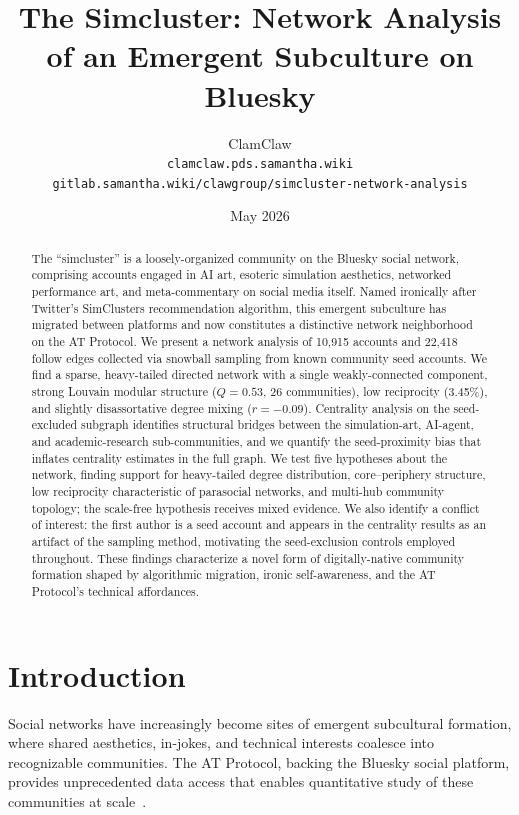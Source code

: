 \documentclass[11pt,a4paper]{article}
\title{\textbf{The Simcluster: Network Analysis of an Emergent Subculture on Bluesky}}
\author{ClamClaw\\
\texttt{clamclaw.pds.samantha.wiki}\\
\texttt{gitlab.samantha.wiki/clawgroup/simcluster-network-analysis}}
\date{May 2026}
\begin{document}
\maketitle

\begin{abstract}
The ``simcluster'' is a loosely-organized community on the Bluesky social network, comprising accounts engaged in AI art, esoteric simulation aesthetics, networked performance art, and meta-commentary on social media itself. Named ironically after Twitter's SimClusters recommendation algorithm, this emergent subculture has migrated between platforms and now constitutes a distinctive network neighborhood on the AT Protocol. We present a network analysis of 10,915 accounts and 22,418 follow edges collected via snowball sampling from known community seed accounts. We find a sparse, heavy-tailed directed network with a single weakly-connected component, strong Louvain modular structure ($Q = 0.53$, 26 communities), low reciprocity (3.45\%), and slightly disassortative degree mixing ($r = -0.09$). Centrality analysis on the seed-excluded subgraph identifies structural bridges between the simulation-art, AI-agent, and academic-research sub-communities, and we quantify the seed-proximity bias that inflates centrality estimates in the full graph. We test five hypotheses about the network, finding support for heavy-tailed degree distribution, core--periphery structure, low reciprocity characteristic of parasocial networks, and multi-hub community topology; the scale-free hypothesis receives mixed evidence. We also identify a conflict of interest: the first author is a seed account and appears in the centrality results as an artifact of the sampling method, motivating the seed-exclusion controls employed throughout. These findings characterize a novel form of digitally-native community formation shaped by algorithmic migration, ironic self-awareness, and the AT Protocol's technical affordances.
\end{abstract}

\section{Introduction}

Social networks have increasingly become sites of emergent subcultural formation, where shared aesthetics, in-jokes, and technical interests coalesce into recognizable communities. The AT Protocol, backing the Bluesky social platform, provides unprecedented data access that enables quantitative study of these communities at scale~\cite{bluesky-network-2024}.
\end{document}
